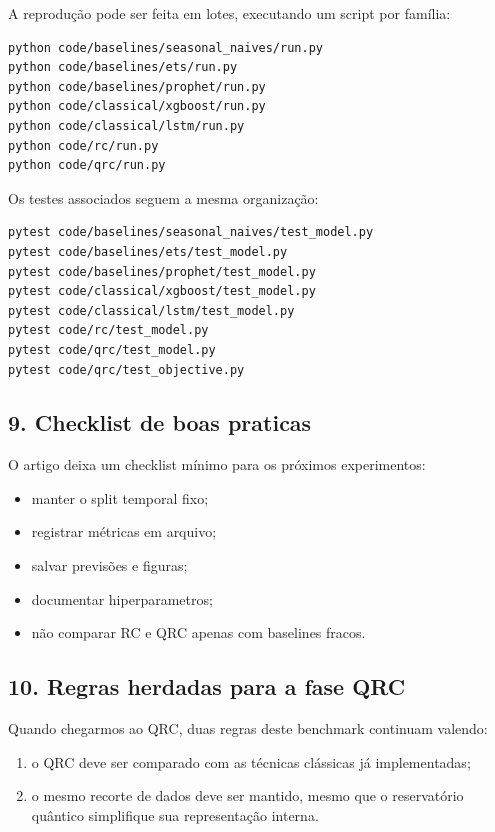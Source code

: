 \documentclass[12pt]{article}
\providecommand{\tightlist}{%
  \setlength{\itemsep}{0pt}\setlength{\parskip}{0pt}}
\begin{document}
A reprodução pode ser feita em lotes, executando um script por família:

\begin{verbatim}
python code/baselines/seasonal_naives/run.py
python code/baselines/ets/run.py
python code/baselines/prophet/run.py
python code/classical/xgboost/run.py
python code/classical/lstm/run.py
python code/rc/run.py
python code/qrc/run.py
\end{verbatim}

Os testes associados seguem a mesma organização:

\begin{verbatim}
pytest code/baselines/seasonal_naives/test_model.py
pytest code/baselines/ets/test_model.py
pytest code/baselines/prophet/test_model.py
pytest code/classical/xgboost/test_model.py
pytest code/classical/lstm/test_model.py
pytest code/rc/test_model.py
pytest code/qrc/test_model.py
pytest code/qrc/test_objective.py
\end{verbatim}

\subsection{9. Checklist de boas praticas}\label{9-checklist-de-boas-praticas}

O artigo deixa um checklist mínimo para os próximos experimentos:

\begin{itemize}
\tightlist
\item
  manter o split temporal fixo;
\item
  registrar métricas em arquivo;
\item
  salvar previsões e figuras;
\item
  documentar hiperparametros;
\item
  não comparar RC e QRC apenas com baselines fracos.
\end{itemize}

\subsection{10. Regras herdadas para a fase QRC}\label{10-regras-herdadas-para-a-fase-qrc}

Quando chegarmos ao QRC, duas regras deste benchmark continuam valendo:

\begin{enumerate}
\def\labelenumi{\arabic{enumi}.}
\tightlist
\item
  o QRC deve ser comparado com as técnicas clássicas já implementadas;
\item
  o mesmo recorte de dados deve ser mantido, mesmo que o reservatório quântico simplifique sua representação interna.
\end{enumerate}
\end{document}
